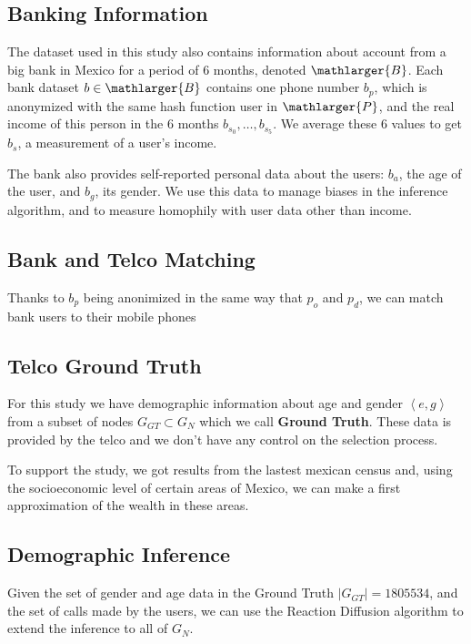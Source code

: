 \subsection{Banking Information}

The dataset used in this study also contains information about account from a big bank in Mexico for a period of 6 months, denoted \( \mathlarger{B} \). Each bank dataset \( b \in \mathlarger{B} \) contains one phone number \( b_p \), which is anonymized with the same hash function user in \( \mathlarger{P} \), and the real income of this person in the 6 months \( b_{s_0}, \ldots, b_{s_5} \). We average these 6 values to get \( b_s \), a measurement of a user's income.

The bank also provides self-reported personal data about the users: \( b_a \), the age of the user, and \( b_g \), its gender. We use this data to manage biases in the inference algorithm, and to measure homophily with user data other than income.

\subsection{Bank and Telco Matching}

Thanks to \( b_p \) being anonimized in the same way that \( p_o \) and \( p_d \), we can match bank users to their mobile phones

\subsection{Telco Ground Truth}

For this study we have demographic information about age and gender \( \left< e, g \right> \) from a subset of nodes \( G_{GT} \subset G_N \) which we call \textbf{Ground Truth}. These data is provided by the telco and we don't have any control on the selection process.

To support the study, we got results from the lastest mexican census \cite{mexico2010census} and, using the socioeconomic level of certain areas of Mexico, we can make a first approximation of the wealth in these areas.

\subsection{Demographic Inference}

Given the set of gender and age data in the Ground Truth \( \left| G_{GT} \right| = 1805534 \), and the set of calls made by the users, we can use the Reaction Diffusion algorithm \cite{brea2014} to extend the inference to all of \( G_N \).


